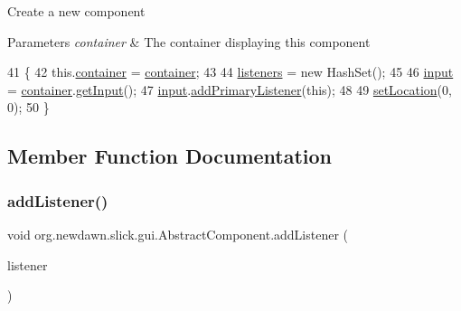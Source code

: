 Create a new component


\begin{DoxyParams}{Parameters}
{\em container} & The container displaying this component \\
\hline
\end{DoxyParams}

\begin{DoxyCode}
41                                                    \{
42         this.\mbox{\hyperlink{classorg_1_1newdawn_1_1slick_1_1gui_1_1_abstract_component_af6d1abaa24da0b9a06fb153722e15435}{container}} = \mbox{\hyperlink{classorg_1_1newdawn_1_1slick_1_1gui_1_1_abstract_component_af6d1abaa24da0b9a06fb153722e15435}{container}};
43 
44         \mbox{\hyperlink{classorg_1_1newdawn_1_1slick_1_1gui_1_1_abstract_component_a7cec595b9b830ed15376739af35a1492}{listeners}} = \textcolor{keyword}{new} HashSet();
45 
46         \mbox{\hyperlink{classorg_1_1newdawn_1_1slick_1_1gui_1_1_abstract_component_a06d7d458d50451485923e23c7d9d2b60}{input}} = \mbox{\hyperlink{classorg_1_1newdawn_1_1slick_1_1gui_1_1_abstract_component_af6d1abaa24da0b9a06fb153722e15435}{container}}.\mbox{\hyperlink{interfaceorg_1_1newdawn_1_1slick_1_1gui_1_1_g_u_i_context_a716423197d42cf412e98f2650603914f}{getInput}}();
47         \mbox{\hyperlink{classorg_1_1newdawn_1_1slick_1_1gui_1_1_abstract_component_a06d7d458d50451485923e23c7d9d2b60}{input}}.\mbox{\hyperlink{classorg_1_1newdawn_1_1slick_1_1_input_a939b8b7b6b5b5f84a2d0bd96fb26ecdb}{addPrimaryListener}}(\textcolor{keyword}{this});
48 
49         \mbox{\hyperlink{classorg_1_1newdawn_1_1slick_1_1gui_1_1_abstract_component_a2cc82d8f8d0fddc059af2e60853f085a}{setLocation}}(0, 0);
50     \}
\end{DoxyCode}


\subsection{Member Function Documentation}
\mbox{\label{classorg_1_1newdawn_1_1slick_1_1gui_1_1_abstract_component_aa3bc3dddf346a26d8e26555106f2bae6}} 
\subsubsection{\texorpdfstring{add\+Listener()}{addListener()}}
{\footnotesize\ttfamily void org.\+newdawn.\+slick.\+gui.\+Abstract\+Component.\+add\+Listener (\begin{DoxyParamCaption}\item[{\mbox{\hyperlink{interfaceorg_1_1newdawn_1_1slick_1_1gui_1_1_component_listener}{Component\+Listener}}}]{listener }\end{DoxyParamCaption})\hspace{0.3cm}{\ttfamily [inline]}}

